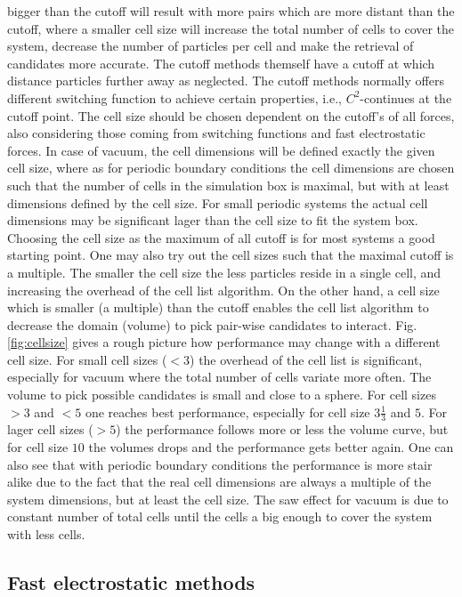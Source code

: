 \documentclass[11pt]{article}
\begin{document}
bigger than the cutoff will result with more pairs which are more
distant than the cutoff, where a smaller cell size will increase the
total number of cells to cover the system, decrease the number of particles per cell and 
make the retrieval of candidates more accurate.
The cutoff methods themself have
a cutoff at which distance particles further away as neglected. The
cutoff methods normally offers different switching function to achieve certain
properties, i.e., $C^2$-continues at the cutoff point. The cell size
should be chosen dependent on the cutoff's of all forces, also
considering those coming from switching functions and fast electrostatic
forces. In case of vacuum, the cell dimensions will be defined exactly the
given cell size, where as for periodic boundary conditions the cell
dimensions are chosen such that the number of cells in the simulation
box is maximal, but with at least dimensions defined by the cell size.
For small periodic systems the actual cell dimensions may be significant
lager than the cell size to fit the system box. Choosing the cell size as
the maximum of all cutoff is for most systems a good starting
point. One may also try out the cell sizes such that the maximal
cutoff is a multiple. The smaller the cell size the less particles
reside in a single cell, and increasing the overhead of the cell list
algorithm. On the other hand, a cell size which is smaller (a
multiple) than the cutoff enables the cell list algorithm to decrease
the domain (volume) to pick pair-wise candidates to
interact. Fig.\ref{fig:cellsize} gives a rough picture how performance
may change with a different cell size. For small cell sizes ($<3$) the
overhead of the cell list is significant, especially for vacuum where
the total number of cells variate more often. The volume to pick
possible candidates is small and close to a sphere. For cell sizes
$>3$ and $<5$ one reaches best performance, especially for cell size
$3\frac{1}{3}$ and $5$. For lager cell sizes ($>5$) the performance
follows more or less the volume curve, but for cell size $10$ the
volumes drops and the performance gets better again.
One can also see that with periodic boundary conditions the performance is more stair
alike due to the fact that the real cell dimensions are always a
multiple of the system dimensions, but at least the cell size. The saw
effect for vacuum is due to constant number of total cells until the
cells a big enough to cover the system with less cells.

\clearpage

\subsection{Fast electrostatic methods}
\end{document}
